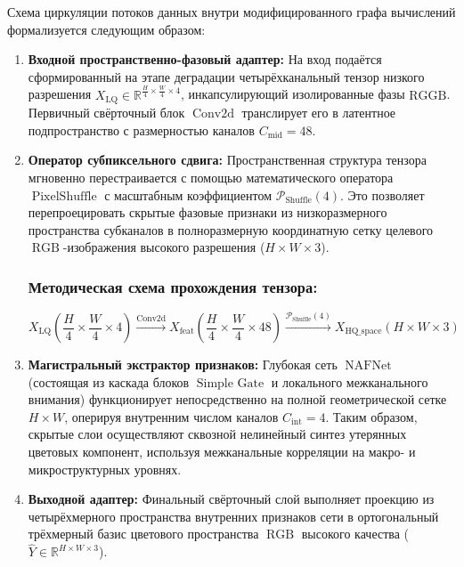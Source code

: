 \documentclass[12pt,a4paper]{article}
\begin{document}
Схема циркуляции потоков данных внутри модифицированного графа вычислений формализуется следующим образом:
\begin{enumerate}
    \item \textbf{Входной пространственно-фазовый адаптер:} На вход подаётся сформированный на этапе деградации четырёхканальный тензор низкого разрешения $X_{\text{LQ}} \in \mathbb{R}^{\frac{H}{4} \times \frac{W}{4} \times 4}$, инкапсулирующий изолированные фазы $\text{RGGB}$. Первичный свёрточный блок $\operatorname{Conv2d}$ транслирует его в латентное подпространство с размерностью каналов $C_{\text{mid}} = 48$.
    \item \textbf{Оператор субпиксельного сдвига:} Пространственная структура тензора мгновенно перестраивается с помощью математического оператора $\operatorname{PixelShuffle}$ с масштабным коэффициентом $\mathcal{P}_{\operatorname{Shuffle}}(4)$. Это позволяет перепроецировать скрытые фазовые признаки из низкоразмерного пространства субканалов в полноразмерную координатную сетку целевого $\operatorname{RGB}$-изображения высокого разрешения ($H \times W \times 3$).
    \subsubsection*{Методическая схема прохождения тензора:}
    \begin{equation}
    X_{\text{LQ}} \left(\frac{H}{4} \times \frac{W}{4} \times 4\right) \xrightarrow{\operatorname{Conv2d}} X_{\text{feat}} \left(\frac{H}{4} \times \frac{W}{4} \times 48\right) \xrightarrow{\mathcal{P}_{\operatorname{Shuffle}}(4)} X_{\text{HQ\_space}} (H \times W \times 3)
    \end{equation}
    \item \textbf{Магистральный экстрактор признаков:} Глубокая сеть $\operatorname{NAFNet}$ (состоящая из каскада блоков $\operatorname{Simple~Gate}$ и локального межканального внимания) функционирует непосредственно на полной геометрической сетке $H \times W$, оперируя внутренним числом каналов $C_{\text{int}} = 4$. Таким образом, скрытые слои осуществляют сквозной нелинейный синтез утерянных цветовых компонент, используя межканальные корреляции на макро- и микроструктурных уровнях.
    \item \textbf{Выходной адаптер:} Финальный свёрточный слой выполняет проекцию из четырёхмерного пространства внутренних признаков сети в ортогональный трёхмерный базис цветового пространства $\operatorname{RGB}$ высокого качества ($\hat{Y} \in \mathbb{R}^{H \times W \times 3}$).
\end{enumerate}
\end{document}
